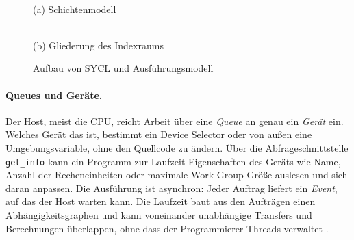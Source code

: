 \documentclass[12pt,a4paper]{article}
\begin{document}
\begin{figure}[htbp]
\centering
\begin{minipage}[b]{0.47\textwidth}\centering
{}\\[0.3em]
{\small (a) Schichtenmodell}
\end{minipage}\hfill
\begin{minipage}[b]{0.5\textwidth}\centering
{}\\[0.3em]
{\small (b) Gliederung des Indexraums}
\end{minipage}
\caption{Aufbau von SYCL und Ausführungsmodell}
\label{fig:stack}
\end{figure}

\paragraph{Queues und Geräte.}
Der Host, meist die CPU, reicht Arbeit über eine \emph{Queue} an genau ein
\emph{Gerät} ein. Welches Gerät das ist, bestimmt ein Device Selector oder
von außen eine Umgebungsvariable, ohne den Quellcode zu ändern. Über die
Abfrageschnittstelle \texttt{get\_info} kann ein Programm zur Laufzeit
Eigenschaften des Geräts wie Name, Anzahl der Recheneinheiten oder maximale
Work-Group-Größe auslesen und sich daran anpassen. Die
Ausführung ist asynchron: Jeder Auftrag liefert ein \emph{Event}, auf das der
Host warten kann. Die Laufzeit baut aus den Aufträgen einen
Abhängigkeitsgraphen und kann voneinander unabhängige Transfers und
Berechnungen überlappen, ohne dass der Programmierer Threads verwaltet
\cite{reinders2023dpcpp}.
\end{document}
